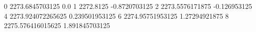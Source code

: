0 2273.6845703125 0.0
1 2272.8125 -0.8720703125
2 2273.5576171875 -0.126953125
4 2273.924072265625 0.239501953125
6 2274.95751953125 1.27294921875
8 2275.576416015625 1.891845703125
